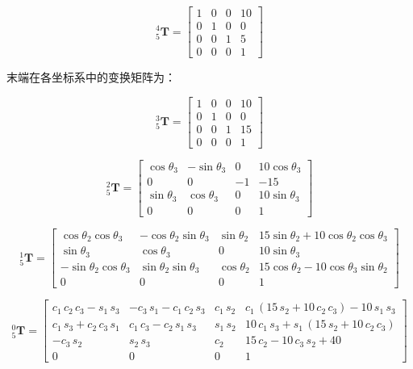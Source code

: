 \documentclass{homework}
\begin{document}
\begin{sol}
\[
  _5^4\mathbf{T} =
  \begin{bmatrix}
    1 & 0 & 0 & 10 \\
    0 & 1 & 0 & 0 \\
    0 & 0 & 1 & 5 \\
    0 & 0 & 0 & 1
  \end{bmatrix}
\]

末端在各坐标系中的变换矩阵为：

\[
  _5^3\mathbf{T} =
  \begin{bmatrix}
    1 & 0 & 0 & 10 \\
    0 & 1 & 0 & 0 \\
    0 & 0 & 1 & 15 \\
    0 & 0 & 0 & 1
  \end{bmatrix}
\]

\[
  _5^2\mathbf{T} =
  \begin{bmatrix}
    \cos\theta_3 & -\sin\theta_3 & 0 & 10 \cos\theta_3 \\
    0 & 0 & -1 & -15 \\
    \sin\theta_3 & \cos\theta_3 & 0 & 10 \sin\theta_3 \\
    0 & 0 & 0 & 1
  \end{bmatrix}
\]

\[
  _5^1\mathbf{T} =
  \begin{bmatrix}
    \cos\theta_2 \cos\theta_3 & -\cos\theta_2 \sin\theta_3 & \sin\theta_2 & 15 \sin\theta_2 + 10 \cos\theta_2 \cos\theta_3 \\
    \sin\theta_3 & \cos\theta_3 & 0 & 10 \sin\theta_3 \\
    -\sin\theta_2 \cos\theta_3 & \sin\theta_2 \sin\theta_3 & \cos\theta_2 & 15 \cos\theta_2 - 10 \cos\theta_3 \sin\theta_2 \\
    0 & 0 & 0 & 1
  \end{bmatrix}
\]

\[
  _5^0\mathbf{T} =
  \begin{bmatrix} 
    c_{1}\,c_{2}\,c_{3}-s_{1}\,s_{3} & -c_{3}\,s_{1}-c_{1}\,c_{2}\,s_{3} & c_{1}\,s_{2} & c_{1}\,\left(15\,s_{2}+10\,c_{2}\,c_{3}\right)-10\,s_{1}\,s_{3} \\ 
    c_{1}\,s_{3}+c_{2}\,c_{3}\,s_{1} & c_{1}\,c_{3}-c_{2}\,s_{1}\,s_{3} & s_{1}\,s_{2} & 10\,c_{1}\,s_{3}+s_{1}\,\left(15\,s_{2}+10\,c_{2}\,c_{3}\right) \\ 
    -c_{3}\,s_{2} & s_{2}\,s_{3} & c_{2} & 15\,c_{2}-10\,c_{3}\,s_{2}+40 \\ 
    0 & 0 & 0 & 1
  \end{bmatrix}
\]


\end{sol}
\end{document}
